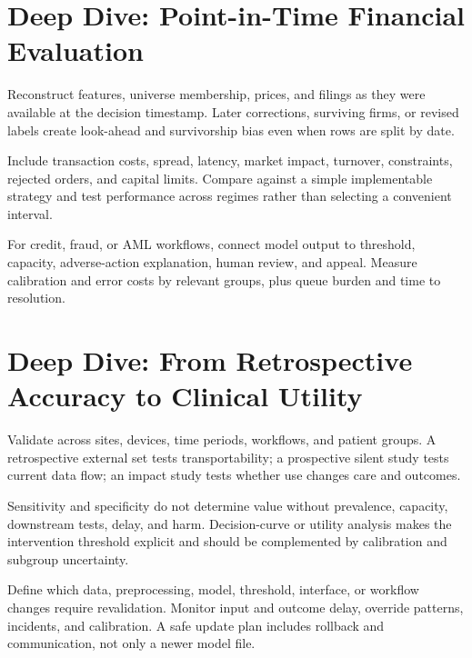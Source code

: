 \expandafter\def\csname almanachdeepdive@fintech\endcsname{%
\section{Deep Dive: Point-in-Time Financial Evaluation}
\begin{tcbitemize}[skin=sectionraster]
\tcbitem[title={What Was Knowable Then?},raster multicolumn=3]
Reconstruct features, universe membership, prices, and filings as they were
available at the decision timestamp.
Later corrections, surviving firms, or revised labels create look-ahead and
survivorship bias even when rows are split by date.

\tcbitem[title={Backtest the Executable Policy},raster multicolumn=3]
Include transaction costs, spread, latency, market impact, turnover,
constraints, rejected orders, and capital limits.
Compare against a simple implementable strategy and test performance across
regimes rather than selecting a convenient interval.

\tcbitem[title={Decisions Need Reasons and Appeals},raster multicolumn=6]
For credit, fraud, or AML workflows, connect model output to threshold,
capacity, adverse-action explanation, human review, and appeal.
Measure calibration and error costs by relevant groups, plus queue burden and
time to resolution.
\end{tcbitemize}
}

\expandafter\def\csname almanachdeepdive@healthcare\endcsname{%
\section{Deep Dive: From Retrospective Accuracy to Clinical Utility}
\begin{tcbitemize}[skin=sectionraster]
\tcbitem[title={External and Prospective Evidence},raster multicolumn=3]
Validate across sites, devices, time periods, workflows, and patient groups.
A retrospective external set tests transportability; a prospective silent
study tests current data flow; an impact study tests whether use changes care
and outcomes.

\tcbitem[title={Thresholds Depend on the Pathway},raster multicolumn=3]
Sensitivity and specificity do not determine value without prevalence,
capacity, downstream tests, delay, and harm.
Decision-curve or utility analysis makes the intervention threshold explicit
and should be complemented by calibration and subgroup uncertainty.

\tcbitem[title={Change Control for Learning Systems},raster multicolumn=6]
Define which data, preprocessing, model, threshold, interface, or workflow
changes require revalidation.
Monitor input and outcome delay, override patterns, incidents, and calibration.
A safe update plan includes rollback and communication, not only a newer model
file.
\end{tcbitemize}
}

